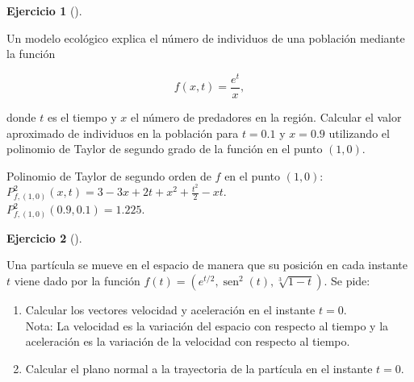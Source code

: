 \documentclass[
  a4paper,
]{scrreport}
\providecommand{\tightlist}{%
  \setlength{\itemsep}{0pt}\setlength{\parskip}{0pt}}\usepackage{longtable,booktabs,array}
\theoremstyle{definition}
\newtheorem{exercise}{Ejercicio}[chapter]
\theoremstyle{remark}
\begin{document}
\begin{exercise}[]\protect\hypertarget{exr-3}{}\label{exr-3}

Un modelo ecológico explica el número de individuos de una población
mediante la función

\[
f(x,t)=\dfrac{e^t}{x},
\]

donde \(t\) es el tiempo y \(x\) el número de predadores en la región.
Calcular el valor aproximado de individuos en la población para
\(t=0.1\) y \(x=0.9\) utilizando el polinomio de Taylor de segundo grado
de la función en el punto \((1,0)\).

\end{exercise}

\begin{tcolorbox}[enhanced jigsaw, opacitybacktitle=0.6, titlerule=0mm, bottomtitle=1mm, toptitle=1mm, breakable, bottomrule=.15mm, left=2mm, opacityback=0, toprule=.15mm, leftrule=.75mm, colframe=quarto-callout-tip-color-frame, coltitle=black, rightrule=.15mm, colback=white, title=\textcolor{quarto-callout-tip-color}{\faLightbulb}\hspace{0.5em}{Solución}, arc=.35mm, colbacktitle=quarto-callout-tip-color!10!white]

Polinomio de Taylor de segundo orden de \(f\) en el punto \((1,0)\):
\(P^2_{f,(1,0)}(x,t)=3-3x+2t+x^2+\frac{t^2}{2}-xt\).\\
\(P^2_{f,(1,0)}(0.9,0.1)=1.225\).

\end{tcolorbox}

\begin{exercise}[]\protect\hypertarget{exr-4}{}\label{exr-4}

Una partícula se mueve en el espacio de manera que su posición en cada
instante \(t\) viene dado por la función
\(f(t)=(e^{t/2}, \operatorname{sen}^2(t), \sqrt[3]{1-t})\). Se pide:

\begin{enumerate}
\def\labelenumi{\arabic{enumi}.}
\tightlist
\item
  Calcular los vectores velocidad y aceleración en el instante
  \(t=0\).\\
  Nota: La velocidad es la variación del espacio con respecto al tiempo
  y la aceleración es la variación de la velocidad con respecto al
  tiempo.
\item
  Calcular el plano normal a la trayectoria de la partícula en el
  instante \(t=0\).
\end{enumerate}

\end{exercise}
\end{document}
